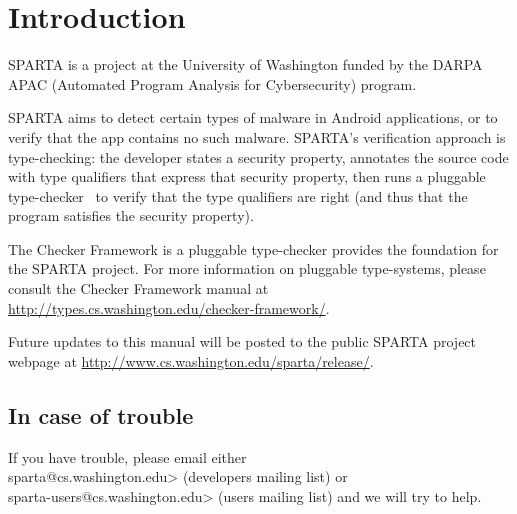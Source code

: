 \htmlhr
\chapter{Introduction\label{introduction}}

SPARTA is a project at the University of Washington funded by the DARPA
APAC (Automated Program Analysis for Cybersecurity) program.


SPARTA aims to detect certain types of malware in Android applications, or
to verify that the app contains no such malware.  SPARTA's verification
approach is type-checking:  the developer states a security property,
annotates the source code with type qualifiers that express that security
property, then runs a pluggable type-checker~\cite{PapiACPE2008,DietlDEMS2011} to verify that the type
qualifiers are right (and thus that the program satisfies the security
property).


The Checker Framework is a pluggable type-checker provides the foundation for the SPARTA project. 
For more information on pluggable type-systems, please consult the Checker Framework manual at 
\url{http://types.cs.washington.edu/checker-framework/}.  


Future updates to this manual will be posted to the public SPARTA project webpage at
\url{http://www.cs.washington.edu/sparta/release/}.

\section{In case of trouble}

If you have trouble, please email either\\
\<sparta@cs.washington.edu>
(developers mailing list) or\\
\<sparta-users@cs.washington.edu> (users
mailing list) and we will try to help.






